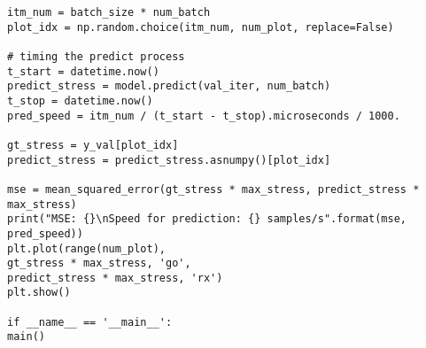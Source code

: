 \begin{verbatim}
itm_num = batch_size * num_batch
plot_idx = np.random.choice(itm_num, num_plot, replace=False)

# timing the predict process
t_start = datetime.now()
predict_stress = model.predict(val_iter, num_batch)
t_stop = datetime.now()
pred_speed = itm_num / (t_start - t_stop).microseconds / 1000.

gt_stress = y_val[plot_idx]
predict_stress = predict_stress.asnumpy()[plot_idx]

mse = mean_squared_error(gt_stress * max_stress, predict_stress * max_stress)
print("MSE: {}\nSpeed for prediction: {} samples/s".format(mse, pred_speed))
plt.plot(range(num_plot),
gt_stress * max_stress, 'go',
predict_stress * max_stress, 'rx')
plt.show()

if __name__ == '__main__':
main()
\end{verbatim}
